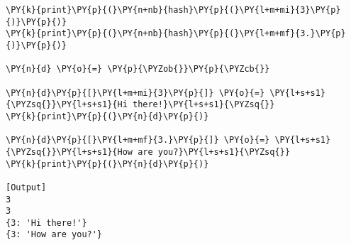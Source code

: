 \begin{Verbatim}[label=\makebox{\url{https://github.com/lucabaldini/cmepda/tree/master/slides/latex/snippets/dict\_hashing.py}},commandchars=\\\{\}]
\PY{k}{print}\PY{p}{(}\PY{n+nb}{hash}\PY{p}{(}\PY{l+m+mi}{3}\PY{p}{)}\PY{p}{)}
\PY{k}{print}\PY{p}{(}\PY{n+nb}{hash}\PY{p}{(}\PY{l+m+mf}{3.}\PY{p}{)}\PY{p}{)}

\PY{n}{d} \PY{o}{=} \PY{p}{\PYZob{}}\PY{p}{\PYZcb{}}

\PY{n}{d}\PY{p}{[}\PY{l+m+mi}{3}\PY{p}{]} \PY{o}{=} \PY{l+s+s1}{\PYZsq{}}\PY{l+s+s1}{Hi there!}\PY{l+s+s1}{\PYZsq{}}
\PY{k}{print}\PY{p}{(}\PY{n}{d}\PY{p}{)}

\PY{n}{d}\PY{p}{[}\PY{l+m+mf}{3.}\PY{p}{]} \PY{o}{=} \PY{l+s+s1}{\PYZsq{}}\PY{l+s+s1}{How are you?}\PY{l+s+s1}{\PYZsq{}}
\PY{k}{print}\PY{p}{(}\PY{n}{d}\PY{p}{)}

[Output]
3
3
{3: 'Hi there!'}
{3: 'How are you?'}
\end{Verbatim}
